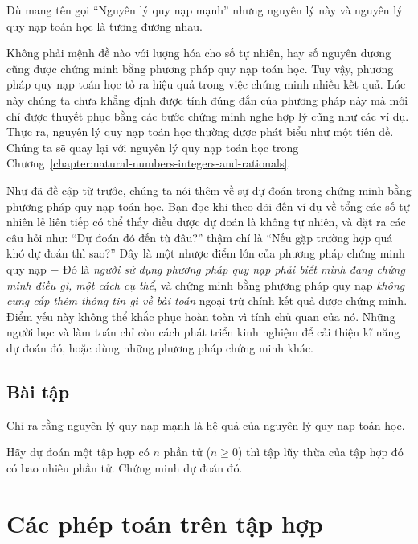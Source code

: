Dù mang tên gọi ``Nguyên lý quy nạp mạnh'' nhưng nguyên lý này và nguyên lý quy nạp toán học là tương đương nhau.

Không phải mệnh đề nào với lượng hóa cho số tự nhiên, hay số nguyên dương cũng được chứng minh bằng phương pháp quy nạp toán học.  Tuy vậy, phương pháp quy nạp toán học tỏ ra hiệu quả trong việc chứng minh nhiều kết quả. Lúc này chúng ta chưa khẳng định được tính đúng đắn của phương pháp này mà mới chỉ được thuyết phục bằng các bước chứng minh nghe hợp lý cũng như các ví dụ. Thực ra, nguyên lý quy nạp toán học thường được phát biểu như một tiên đề. Chúng ta sẽ quay lại với nguyên lý quy nạp toán học trong Chương~\ref{chapter:natural-numbers-integers-and-rationals}.

Như đã đề cập từ trước, chúng ta nói thêm về sự dự đoán trong chứng minh bằng phương pháp quy nạp toán học. Bạn đọc khi theo dõi đến ví dụ về tổng các số tự nhiên lẻ liên tiếp có thể thấy điều được dự đoán là không tự nhiên, và đặt ra các câu hỏi như: ``Dự đoán đó đến từ đâu?\@'' thậm chí là ``Nếu gặp trường hợp quá khó dự đoán thì sao?\@'' Đây là một nhược điểm lớn của phương pháp chứng minh quy nạp $-$ Đó là \textit{người sử dụng phương pháp quy nạp phải biết mình đang chứng minh điều gì, một cách cụ thể}, và chứng minh bằng phương pháp quy nạp \textit{không cung cấp thêm thông tin gì về bài toán} ngoại trừ chính kết quả được chứng minh. Điểm yếu này không thể khắc phục hoàn toàn vì tính chủ quan của nó. Những người học và làm toán chỉ còn cách phát triển kinh nghiệm để cải thiện kĩ năng dự đoán đó, hoặc dùng những phương pháp chứng minh khác.

\subsection{Bài tập}
\setcounter{exercise}{0}

\begin{exercise}
    Chỉ ra rằng nguyên lý quy nạp mạnh là hệ quả của nguyên lý quy nạp toán học.
\end{exercise}

\begin{exercise}
    Hãy dự đoán một tập hợp có $n$ phần tử ($n\geq 0$) thì tập lũy thừa của tập hợp đó có bao nhiêu phần tử. Chứng minh dự đoán đó.
\end{exercise}

\section{Các phép toán trên tập hợp}

